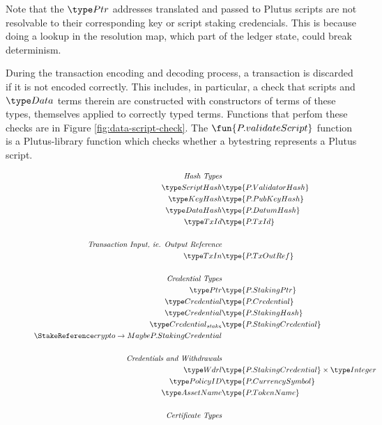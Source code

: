 Note that the $\Ptr$ addresses translated and passed to Plutus scripts are
not resolvable to their corresponding key or script staking credencials. This
is because doing a lookup in the resolution map, which part of the ledger state,
could break determinism.

During the transaction encoding and decoding process, a transaction is discarded if it is not
encoded correctly. This includes, in particular, a check that scripts and $\Data$
terms therein are constructed with constructors of terms of these types, themselves
applied to correctly typed terms. Functions that perfom these checks are
in Figure \ref{fig:data-script-check}. The $\fun{P.validateScript}$ function
is a Plutus-library function which checks whether a bytestring represents a
Plutus script.

\begin{figure*}[htb]
  \begin{align*}
    \emph{Hash Types} \\
    \ScriptHash & \type{P.ValidatorHash} \\
    \KeyHash & \type{P.PubKeyHash} \\
    \DataHash & \type{P.DatumHash} \\
    \TxId & \type{P.TxId} \\
    ~\\
    \emph{Transaction Input, ie. Output Reference}  \\
    \TxIn & \type{P.TxOutRef} \\
    ~\\
    \emph{Credential Types} \\
    \Ptr & \type{P.StakingPtr} \\
    \Credential & \type{P.Credential} \\
    \Credential & \type{P.StakingHash} \\
    \StakeCredential & \type{P.StakingCredential} \\
    \StakeReference crypto \to Maybe P.StakingCredential \\
    ~\\
    \emph{Credentials and Withdrawals} \\
    \Wdrl & \type{P.StakingCredential} \times \Integer \\
    \PolicyID & \type{P.CurrencySymbol} \\
    \AssetName & \type{P.TokenName} \\
    ~\\
    \emph{Certificate Types} \\

\end{align*}
\end{figure*}
